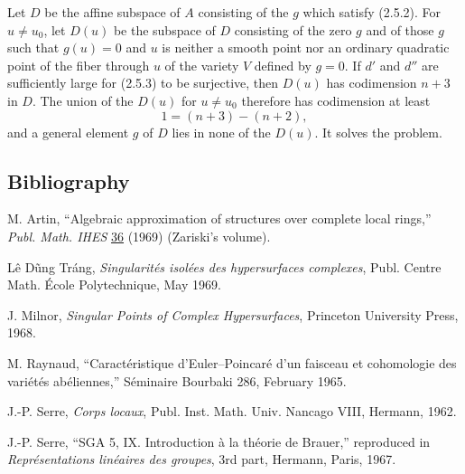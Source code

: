 Let $D$ be the affine subspace of $A$ consisting of the $g$ which
satisfy (2.5.2).  For $u\ne u_0$, let $D(u)$ be the subspace of $D$
consisting of the zero $g$ and of those $g$ such that $g(u)=0$ and
$u$ is neither a smooth point nor an ordinary quadratic point of the
fiber through $u$ of the variety $V$ defined by $g=0$.  If $d'$ and
$d''$ are sufficiently large for (2.5.3) to be surjective, then
$D(u)$ has codimension $n+3$ in $D$.  The union of the $D(u)$ for
$u\ne u_0$ therefore has codimension at least
\[
1=(n+3)-(n+2),
\]
and a general element $g$ of $D$ lies in none of the $D(u)$.  It
solves the problem.

\subsection*{Bibliography}

\begin{enumerate}[label={[\arabic*]},leftmargin=3em]
\item M. Artin, ``Algebraic approximation of structures over complete
local rings,'' \emph{Publ. Math. IHES} \underline{36} (1969)
(Zariski's volume).
\item L\^e D\~ung Tr\'ang, \emph{Singularit\'es isol\'ees des
hypersurfaces complexes}, Publ. Centre Math. \'Ecole Polytechnique,
May 1969.
\item J. Milnor, \emph{Singular Points of Complex Hypersurfaces},
Princeton University Press, 1968.
\item M. Raynaud, ``Caract\'eristique d'Euler--Poincar\'e d'un
faisceau et cohomologie des vari\'et\'es ab\'eliennes,'' S\'eminaire
Bourbaki 286, February 1965.
\item J.-P. Serre, \emph{Corps locaux}, Publ. Inst. Math. Univ.
Nancago VIII, Hermann, 1962.
\item J.-P. Serre, ``SGA 5, IX. Introduction \`a la th\'eorie de
Brauer,'' reproduced in \emph{Repr\'esentations lin\'eaires des
groupes}, 3rd part, Hermann, Paris, 1967.
\end{enumerate}
